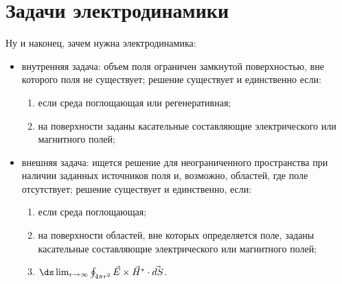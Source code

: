 \section{Задачи электродинамики}
  Ну и наконец, зачем нужна электродинамика:
  \begin{itemize}
  \item внутренняя задача: объем поля ограничен замкнутой поверхностью, вне
  которого поля не существует; решение существует и единственно если:
  \begin{enumerate}
  \item если среда поглощающая или регенеративная;
  \item на поверхности заданы касательные составляющие электрического или
  магнитного полей;
  \end{enumerate}
  \item внешняя задача: ищется решение для неограниченного пространства при
  наличии заданных источников поля и, возможно, областей, где поле отсутствует;
  решение существует и единственно, если:
    \begin{enumerate}
  \item если среда поглощающая;
  \item на поверхности областей, вне которых определяется поле, заданы
  касательные составляющие электрического или магнитного полей;
  \item \(\ds
        \lim_{r\to\infty}\oint_{4\pi r^2} \vec{E}\times\vec{H}^*\cdot\vec{dS}\).
  \end{enumerate}
  \end{itemize}
